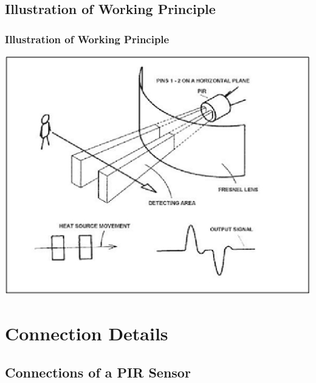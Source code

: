 \documentclass[table,10pt,red]{beamer}	%
\begin{document}
\subsection{Illustration of Working Principle}
 \begin{frame}
	\frametitle{Illustration of Working Principle}
\pause
\begin{minipage}[c]{0.80\textwidth}
\begin{center}

\hspace*{10mm}\includegraphics[width=\linewidth]{Working.png}		
\end{center}	
	\end{minipage}

\end{frame}


\section{Connection Details} %

\subsection{Connections of a PIR Sensor} %
\end{document}
